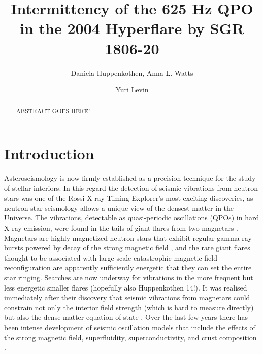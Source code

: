 \documentclass{emulateapj}
\begin{document}
\title{Intermittency of the 625 Hz QPO in the 2004 Hyperflare by SGR 1806-20}
\author{Daniela Huppenkothen, Anna L. Watts}
\author{Yuri Levin}

\begin{abstract}
ABSTRACT GOES HERE!
\end{abstract} 

\section{Introduction}
\label{sec:introduction}
Asteroseismology is now firmly established as a precision technique for the study of stellar interiors. In this regard the detection of seismic vibrations from neutron stars was one of the Rossi X-ray Timing Explorer's most exciting discoveries, as neutron star seismology allows a unique view of the densest matter in the Universe. The vibrations, detectable as quasi-periodic oscillations (QPOs) in hard X-ray emission, were found in the tails of giant flares from two magnetars \citep{Israel05, Strohmayer05, Strohmayer06, Watts06}. Magnetars are highly magnetized neutron stars that exhibit regular gamma-ray bursts powered by decay of the strong magnetic field \citep{Thompson95}, and the rare giant flares thought to be associated with large-scale catastrophic magnetic field reconfiguration are apparently sufficiently energetic that they can set the entire star ringing. Searches are now underway for vibrations in the more frequent but less energetic smaller flares \citep{Huppenkothen13} (hopefully also Huppenkothen 14!). It was realised immediately after their discovery that seismic vibrations from magnetars could constrain not only the interior field strength (which is hard to measure directly) but also the dense matter equation of state \citep{Samuelsson07,Watts07}. Over the last few years there has been intense development of seismic oscillation models that include the effects of the strong magnetic field, superfluidity, superconductivity, and crust composition \citep{Levin06,Levin07,Glampedakis06,Andersson09,Steiner09,vanHoven11,vanHoven12, Colaiuda11,Gabler12, Gabler13, Passamonti13a, Passamonti13b}.   
\end{document}
